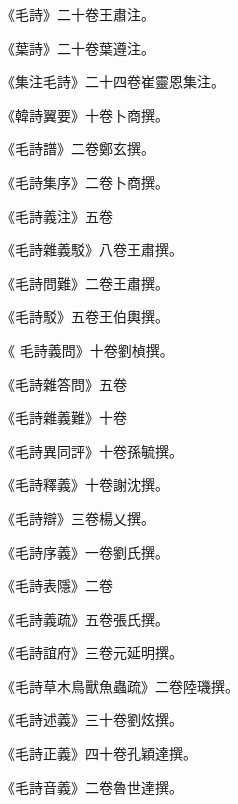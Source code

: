 \begin{pinyinscope}
 《毛詩》二十卷王肅注。



 《葉詩》二十卷葉遵注。



 《集注毛詩》二十四卷崔靈恩集注。



 《韓詩翼要》十卷卜商撰。



 《毛詩譜》二卷鄭玄撰。



 《毛詩集序》二卷卜商撰。



 《毛詩義注》五卷



 《毛詩雜義駁》八卷王肅撰。



 《毛詩問難》二卷王肅撰。



 《毛詩駁》五卷王伯輿撰。



 《
 毛詩義問》十卷劉楨撰。



 《毛詩雜答問》五卷



 《毛詩雜義難》十卷



 《毛詩異同評》十卷孫毓撰。



 《毛詩釋義》十卷謝沈撰。



 《毛詩辯》三卷楊乂撰。



 《毛詩序義》一卷劉氏撰。



 《毛詩表隱》二卷



 《毛詩義疏》五卷張氏撰。



 《毛詩誼府》三卷元延明撰。



 《毛詩草木鳥獸魚蟲疏》二卷陸璣撰。



 《毛詩述義》三十卷劉炫撰。



 《毛詩正義》四十卷孔穎達撰。



 《毛詩音義》二卷魯世達撰。




\end{pinyinscope}
